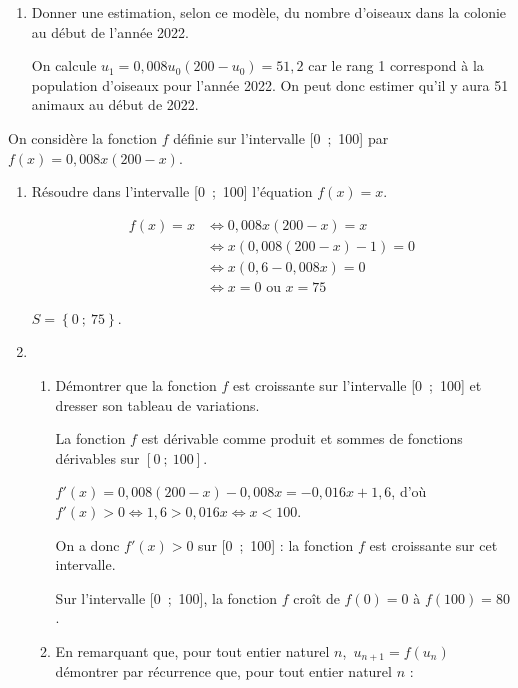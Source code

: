 \documentclass[11pt]{article}
\begin{document}
\medskip

\begin{enumerate}
\item Donner une estimation, selon ce modèle, du nombre d'oiseaux dans la colonie au
début de l'année 2022.

On calcule $u_1 = 0,008u_0(200- u_0) = 51,2$ car le rang 1 correspond à la population d'oiseaux pour l'année 2022. On peut donc estimer qu'il y aura 51 animaux au début de 2022.
\end{enumerate}

On considère la fonction $f$ définie sur l'intervalle [0~;~100] par $f(x) = 0,008x(200 - x)$.

\begin{enumerate}
\item Résoudre dans l'intervalle [0~;~100] l'équation $f(x) = x$.

\begin{align*}
f(x) = x &\iff  0,008x(200-x) = x \\
&\iff  x(0,008(200-x)-1)=0 \\
&\iff  x(0,6-0,008x)=0 \\
&\iff  x=0 \text{~ou~} x=75
\end{align*}

$S = \left\{0~;~75 \right\}$.
\item
	\begin{enumerate}
		\item Démontrer que la fonction $f$ est croissante sur l'intervalle [0~;~100] et dresser son tableau de variations.
		
La fonction $f$ est dérivable comme produit et sommes de fonctions dérivables sur $[0~;~100]$. 
		
$f'(x)=0,008(200 - x) - 0,008x = -0,016x + 1,6$, d'où  $f'(x) > 0 \iff 1,6 > 0,016x \iff  x < 100$.
		
On a donc $f'(x) > 0$ sur [0~;~100] : la fonction $f$ est croissante sur cet intervalle.
		
Sur l'intervalle [0~;~100], la fonction $f$ croît de $f(0) = 0$ à $f(100) = 80$.
		
		\item En remarquant que, pour tout entier naturel $n$,\, $u_{n+1} = f\left(u_n\right)$ démontrer par récurrence que, pour tout entier naturel $n$ :


\end{enumerate}
\end{enumerate}
\end{document}
